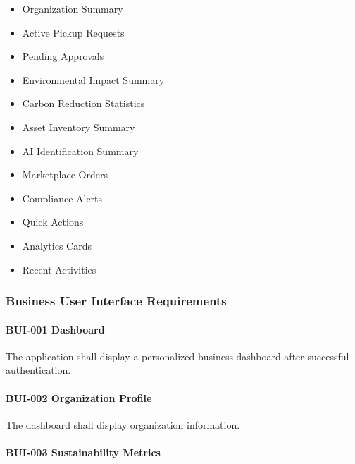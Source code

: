 \begin{itemize}

\item Organization Summary

\item Active Pickup Requests

\item Pending Approvals

\item Environmental Impact Summary

\item Carbon Reduction Statistics

\item Asset Inventory Summary

\item AI Identification Summary

\item Marketplace Orders

\item Compliance Alerts

\item Quick Actions

\item Analytics Cards

\item Recent Activities

\end{itemize}


\subsubsection*{Business User Interface Requirements}

\paragraph{BUI-001 Dashboard}

The application shall display a personalized business dashboard after
successful authentication.

\paragraph{BUI-002 Organization Profile}

The dashboard shall display organization information.

\paragraph{BUI-003 Sustainability Metrics}


